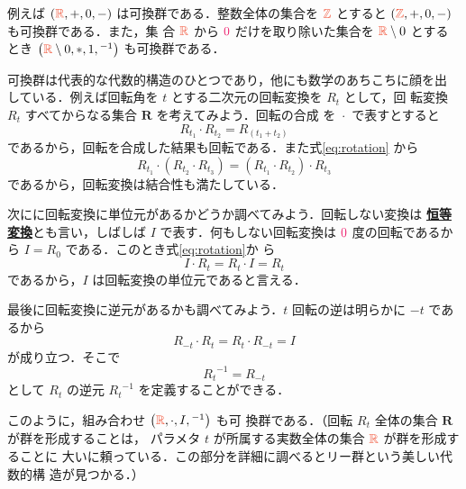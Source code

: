 \documentclass[a5paper,twoside,fleqn,draft]{jsbook}
\def\constantColor{WildStrawberry}
\def\typeColor{RedOrange}
\newcommand{\keyword}[1]{{\underline{\textbf{#1}}}}
\newcommand{\mConstant}[1]{\textcolor{\constantColor}{#1}}
\newcommand{\mZeroNumber}{{\mConstant{0}}}
\DeclareMathOperator{\mCompRot}{\cdot} %
\newcommand{\mSet}[1]{\mathbf{#1}}
\newcommand{\mSpecialSet}[1]{\textcolor{\typeColor}{\mathbb{#1}}}
\newcommand{\mRSet}{\mSpecialSet{R}}
\newcommand{\mZSet}{\mSpecialSet{Z}}
\newcommand{\mTupleWith}[1]{\left(#1\right)}
\begin{document}
例えば $\mTupleWith{\mRSet,+,0,-}$ は可換群である．整数全体の集合を
$\mZSet$ とすると $\mTupleWith{\mZSet,+,0,-}$ も可換群である．また，集
合 $\mRSet$ から $\mZeroNumber$ だけを取り除いた集合を $\mRSet\setminus0$ とする
とき $\mTupleWith{\mRSet\setminus0,*,1,{}^{-1}}$ も可換群である．

可換群は代表的な代数的構造のひとつであり，他にも数学のあちこちに顔を出
している．例えば回転角を $t$ とする二次元の回転変換を $R_t$ として，回
転変換 $R_t$ すべてからなる集合 $\mSet{R}$ を考えてみよう．回転の合成
を $\mCompRot$ で表すとすると
\begin{equation}
\label{eq:rotation}
R_{t_1}\mCompRot R_{t_2}=R_{(t_1+t_2)}
\end{equation}
であるから，回転を合成した結果も回転である．また式\eqref{eq:rotation}
から
\begin{equation}
  R_{t_1}\mCompRot\left(R_{t_2}\mCompRot R_{t_3}\right)
  =\left(R_{t_1}\mCompRot R_{t_2}\right)\mCompRot R_{t_3}
\end{equation}
であるから，回転変換は結合性も満たしている．

次にに回転変換に単位元があるかどうか調べてみよう．回転しない変換は
\keyword{恒等変換}とも言い，しばしば $I$ で表す．何もしない回転変換は
$\mZeroNumber$ 度の回転であるから $I=R_0$ である．このとき式\eqref{eq:rotation}か
ら
\begin{equation}
I\mCompRot R_t=R_t\mCompRot I=R_t
\end{equation}
であるから，$I$ は回転変換の単位元であると言える．

最後に回転変換に逆元があるかも調べてみよう．$t$ 回転の逆は明らかに
$-t$ であるから
\begin{equation}
R_{-t}\mCompRot R_t=R_t\mCompRot R_{-t}=I
\end{equation}
が成り立つ．そこで
\begin{equation}
{R_t}^{-1}=R_{-t}
\end{equation}
として $R_t$ の逆元 ${R_t}^{-1}$ を定義することができる．

このように，組み合わせ $\mTupleWith{\mRSet,\mCompRot,I,{}^{-1}}$ も可
換群である．（回転 $R_t$ 全体の集合 $\mSet{R}$ が群を形成することは，
パラメタ $t$ が所属する実数全体の集合 $\mRSet$ が群を形成することに
大いに頼っている．この部分を詳細に調べるとリー群という美しい代数的構
造が見つかる．）
\end{document}
